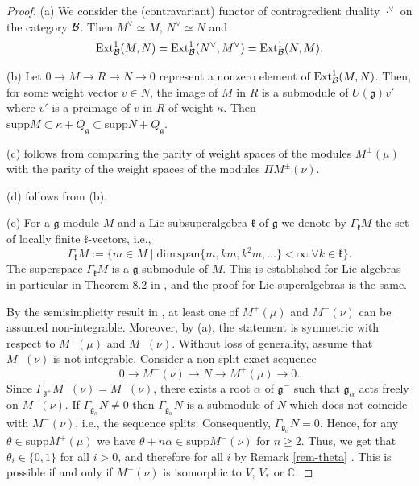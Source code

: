 \documentclass[12pt]{amsart}
\makeatletter
\def\mathcal{\cal}
\def\@putname#1#2#3#4{\def\@@ref{#3}\let\old@bf\bf
        \def\bf##1{\old@bf\if?\noexpand##1?{#4}\else##1\fi}%
	#1{#2}%
        \let\bf\old@bf}
\def\@putname#1#2#3#4{\def\@@ref{#3}\let\old@bf\bf	%
	\let\old@reset@font\reset@font			%
        \def\bf##1{\old@bf\if?\noexpand##1?{#4}\else##1\fi}%
	\def\reset@font##1##2{\old@reset@font##1\if?\noexpand##2?{#4}\else##2\fi}#1{#2}%
        \let\bf\old@bf\let\reset@font\old@reset@font}
\let\my@ref=\ref
\def\ref#1{\@putname\my@ref{#1}{#1}{\tiny\rm\@@ref}}
\let\my@cite=\cite
\def\cite#1{\@putname\my@cite{#1}{\@citeb}{\tiny\rm\@@ref}}
\theoremstyle{plain} %
\numberwithin{equation}{section}
\theoremstyle{definition}
\theoremstyle{remark}
\theoremstyle{plain} %
\renewcommand{\gg}{\mathfrak{g}}
\renewcommand{\dim}{\mathrm{dim}}
\newcommand{\Ext}{\mathrm{Ext}}
\newcommand{\supp}{\mathrm{supp}}
\newcommand{\C}{\mathbb{C}}
\def\gg{\mathfrak{g}}
\def\gk{\mathfrak{k}}
\makeatother
\begin{document}
          \begin{proof} (a) We consider the (contravariant) functor of contragredient duality ${\cdot}^\vee$ on the category $\mathcal B$.
            Then $M^\vee\simeq M$, $N^\vee\simeq N$ and
            $$\Ext_{\mathcal B}^1(M,N)=\Ext_{\mathcal B}^1(N^\vee,M^\vee)=\Ext_{\mathcal B}^1(N,M).$$

            (b) Let $0 \to M \to R \to N \to 0$ represent a nonzero element of $\Ext_{\mathcal B}^1(M,N)$. Then, for some weight vector $v \in N$, the image of $M$ in $R$ is a submodule of $U(\gg)v'$ where $v'$ is a preimage of $v$ in $R$ of weight $\kappa$. Then $\supp M\subset  \kappa +Q_{\gg} \subset \supp N+Q_{\gg}$.
            

(c) follows from comparing the parity of weight spaces of the modules $M^{\pm} (\mu)$ with the parity of the weight spaces of the modules  $\Pi M^{\pm} (\nu)$.

            (d) follows from (b).

            (e)            For a
            $\gg$-module $M$ and a Lie subsuperalgebra $\gk$ of $\gg$ we denote by 
            $\Gamma_{\gk}M$ the set of locally finite $\gk$-vectors, i.e.,
            $$\Gamma_{\gk}M :=  \{ m \in M \; | \; \dim \, \mbox{span} \{m, km, k^2m,...\} <\infty \; \forall k \in \gk \}.
            $$
             The superspace $\Gamma_{\gk}M$ is a $\gg$-submodule of $M$. This is established for Lie algebras in particular in Theorem 8.2 in \cite{PH}, and the proof for Lie superalgebras is the same.
             
            By the semisimplicity result in \cite{CP}, at least one of $M^+(\mu)$ and $M^-(\nu)$ can be assumed non-integrable. Moreover, by (a), the statement is symmetric with respect to $M^+(\mu)$ and $M^-(\nu)$. 
                      Without loss of generality, assume that $M^-(\nu)$ is not integrable. Consider a non-split exact sequence
                      $$0\to M^-(\nu)\to N\to M^+(\mu)\to 0.$$
                                      Since $\Gamma_{\gg^+}M^-(\nu)=M^-(\nu)$, there exists a root $\alpha$ of $\gg^-$ such that $\gg_{\alpha}$ acts freely on $M^-(\nu)$. If  $\Gamma_{\gg_{\alpha}}N\neq 0$ then
                                       $\Gamma_{\gg_{\alpha}}N$ is a submodule of $N$ which does not coincide with $M^-(\nu) $, i.e., the  sequence splits.  Consequently, $\Gamma_{\gg_{\alpha}}N=0$. Hence, for any
                      $\theta\in\supp M^+(\mu)$ we have $\theta+n\alpha\in\supp M^{-}(\nu)$ for  $n\geq 2$. Thus, we get that $\theta_i\in\{0,1\}$ for all $i>0$, and therefore for all $i$ by Remark \ref{rem-theta}. This is possible if and only if
                      $M^-(\nu)$ is isomorphic to $V$, $V_*$ or $\C$.
       

\end{proof}
\end{document}
